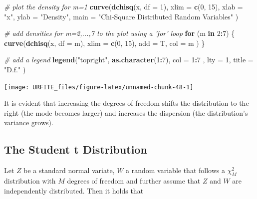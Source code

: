 \documentclass[]{book}
\newenvironment{Shaded}{\begin{snugshade}}{\end{snugshade}}
\newcommand{\KeywordTok}[1]{\textcolor[rgb]{0.13,0.29,0.53}{\textbf{#1}}}
\newcommand{\DataTypeTok}[1]{\textcolor[rgb]{0.13,0.29,0.53}{#1}}
\newcommand{\DecValTok}[1]{\textcolor[rgb]{0.00,0.00,0.81}{#1}}
\newcommand{\StringTok}[1]{\textcolor[rgb]{0.31,0.60,0.02}{#1}}
\newcommand{\CommentTok}[1]{\textcolor[rgb]{0.56,0.35,0.01}{\textit{#1}}}
\newcommand{\ControlFlowTok}[1]{\textcolor[rgb]{0.13,0.29,0.53}{\textbf{#1}}}
\newcommand{\OperatorTok}[1]{\textcolor[rgb]{0.81,0.36,0.00}{\textbf{#1}}}
\newcommand{\NormalTok}[1]{#1}
\theoremstyle{definition}
\theoremstyle{definition}
\theoremstyle{definition}
\theoremstyle{remark}
\begin{document}
\begin{Shaded}
\begin{Highlighting}[]
\CommentTok{# plot the density for m=1}
\KeywordTok{curve}\NormalTok{(}\KeywordTok{dchisq}\NormalTok{(x, }\DataTypeTok{df =} \DecValTok{1}\NormalTok{), }
      \DataTypeTok{xlim =} \KeywordTok{c}\NormalTok{(}\DecValTok{0}\NormalTok{, }\DecValTok{15}\NormalTok{), }
      \DataTypeTok{xlab =} \StringTok{"x"}\NormalTok{, }
      \DataTypeTok{ylab =} \StringTok{"Density"}\NormalTok{, }
      \DataTypeTok{main =} \StringTok{"Chi-Square Distributed Random Variables"}
\NormalTok{      )}

\CommentTok{# add densities for m=2,...,7 to the plot using a 'for' loop }
\ControlFlowTok{for}\NormalTok{ (m }\ControlFlowTok{in} \DecValTok{2}\OperatorTok{:}\DecValTok{7}\NormalTok{) \{}
  \KeywordTok{curve}\NormalTok{(}\KeywordTok{dchisq}\NormalTok{(x, }\DataTypeTok{df =}\NormalTok{ m),}
        \DataTypeTok{xlim =} \KeywordTok{c}\NormalTok{(}\DecValTok{0}\NormalTok{, }\DecValTok{15}\NormalTok{), }
        \DataTypeTok{add =}\NormalTok{ T, }
        \DataTypeTok{col =}\NormalTok{ m}
\NormalTok{        )}
\NormalTok{\}}

\CommentTok{# add a legend}
\KeywordTok{legend}\NormalTok{(}\StringTok{"topright"}\NormalTok{, }
       \KeywordTok{as.character}\NormalTok{(}\DecValTok{1}\OperatorTok{:}\DecValTok{7}\NormalTok{), }
       \DataTypeTok{col =} \DecValTok{1}\OperatorTok{:}\DecValTok{7}\NormalTok{ , }
       \DataTypeTok{lty =} \DecValTok{1}\NormalTok{, }
       \DataTypeTok{title =} \StringTok{"D.f."}
\NormalTok{       )}
\end{Highlighting}
\end{Shaded}

\begin{center}\texttt{[image: URFITE\_files/figure-latex/unnamed-chunk-48-1]} \end{center}

It is evident that increasing the degrees of freedom shifts the
distribution to the right (the mode becomes larger) and increases the
dispersion (the distribution's variance grows).

\subsection*{The Student t Distribution}\label{thetdist}

Let \(Z\) be a standard normal variate, \(W\) a random variable that
follows a \(\chi^2_M\) distribution with \(M\) degrees of freedom and
further assume that \(Z\) and \(W\) are independently distributed. Then
it holds that
\end{document}
